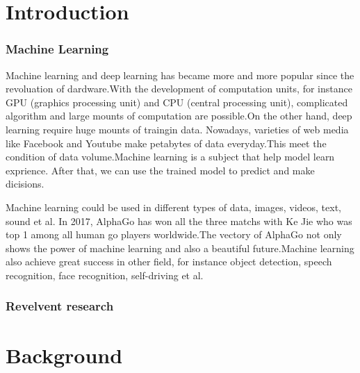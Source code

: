 \documentclass[12pt,a4paper]{report}
\begin{document}
\newpage
{}
\section{Introduction}
\subsubsection{Machine Learning}
Machine learning and deep learning has became  more and more popular since the revoluation of dardware.With the development of computation units, for instance GPU (graphics processing unit) and CPU (central processing unit), complicated algorithm and large mounts of computation are  possible.On the other hand, deep learning require huge mounts of traingin data. Nowadays, varieties of web media like Facebook and Youtube make  petabytes of data everyday.This meet the  condition of data volume.Machine learning is a subject that help model   learn exprience. After that, we can use the trained model to predict and make dicisions.

Machine learning could be used in different types of data, images, videos, text, sound et al. In 2017, AlphaGo has won all the three matchs with Ke Jie who was top 1 among all human  go players worldwide.The vectory of AlphaGo not only shows the power of machine learning and also a beautiful future.Machine learning also achieve great success in other field, for instance object detection, speech recognition, face recognition, self-driving et al.
\subsubsection{Revelvent research}
\newpage
\section{Background}
\end{document}
